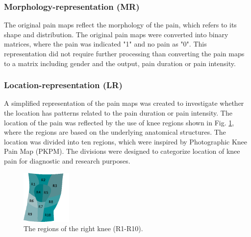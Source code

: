 \subsubsection{Morphology-representation (MR)}
The original pain maps reflect the morphology of the pain, which refers to its shape and distribution. The original pain maps were converted into binary matrices, where the pain was indicated "1" and no pain as "0". This representation did not require further processing than converting the pain maps to a matrix including gender and the output, pain duration or pain intensity. 

\subsubsection{Location-representation (LR)} 
A simplified representation of the pain maps was created to investigate whether the location has patterns related to the pain duration or pain intensity. The location of the pain was reflected by the use of knee regions shown in Fig. \ref{fig:atlas}, where the regions are based on the underlying anatomical structures.
The location was divided into ten regions, which were inspired by Photographic Knee Pain Map (PKPM). The divisions were designed to categorize location of knee pain for diagnostic and research purposes.\citep{Elson2010}

\begin{figure} [H] 
\centering
\includegraphics[width=0.22\textwidth]{Figures/atlas}
\caption{The regions of the right knee (R1-R10).}
\label{fig:atlas}
\end{figure}

